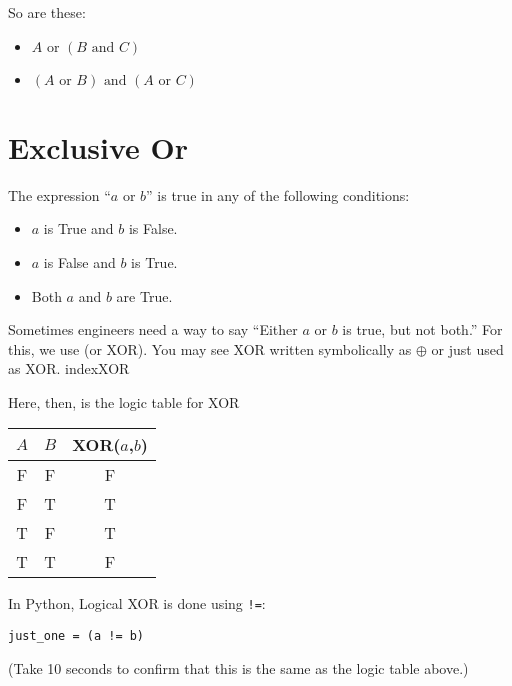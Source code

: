 So are these:

\begin{itemize}
  \item $A \text{ or } \left(B \text{ and } C \right)$
  \item $\left(A \text{ or } B \right) \text{ and } \left( A \text{ or } C \right)$
\end{itemize}


\section{Exclusive Or}

The expression ``$a \text{ or } b$'' is true in any of the following conditions:
\begin{itemize}
\item $a$ is True and $b$ is False.
\item $a$ is False and $b$ is True.
\item Both $a$ and $b$ are True.
\end{itemize}

Sometimes engineers need a way to say ``Either $a$ or $b$ is true, but not
both.'' For this, we use  (or XOR). You may see XOR written symbolically as $\oplus$ or just used as XOR. index{XOR}

Here, then, is the logic table for XOR

\begin{tabular}{c | c | c}
  $A$ & $B$ & XOR($a$,$b$) \\
  \hline
  F & F & F \\
  F & T & T \\
  T & F & T \\
  T & T & F \\
\end{tabular}

In Python, Logical XOR is done using \texttt{!=}:

\begin{verbatim}
just_one = (a != b)
\end{verbatim}

(Take 10 seconds to confirm that this is the same as the logic table
above.)


